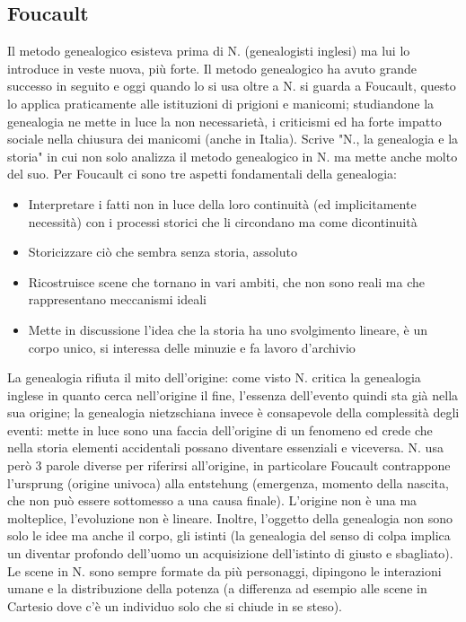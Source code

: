 \documentclass[10pt,a4paper]{article}
\begin{document}
\subsection{Foucault}
Il metodo genealogico esisteva prima di N. (genealogisti inglesi) ma lui lo introduce in veste nuova, più forte. Il metodo genealogico ha avuto grande successo in seguito e oggi quando lo si usa oltre a N. si guarda a Foucault, questo lo applica praticamente alle istituzioni di prigioni e manicomi; studiandone la genealogia ne mette in luce la non necessarietà, i criticismi ed ha forte impatto sociale nella chiusura dei manicomi (anche in Italia). Scrive "N., la genealogia e la storia" in cui non solo analizza il metodo genealogico in N. ma mette anche molto del suo. Per Foucault ci sono tre aspetti fondamentali della genealogia:
\begin{itemize}
	\item Interpretare i fatti non in luce della loro continuità (ed implicitamente necessità) con i processi storici che li circondano ma come dicontinuità
	\item Storicizzare ciò che sembra senza storia, assoluto
	\item Ricostruisce scene che tornano in vari ambiti, che non sono reali ma che rappresentano meccanismi ideali
	\item Mette in discussione l'idea che la storia ha uno svolgimento lineare, è un corpo unico, si interessa delle minuzie e fa lavoro d'archivio
\end{itemize} 
La genealogia rifiuta il mito dell'origine: come visto N. critica la genealogia inglese in quanto cerca nell'origine il fine, l'essenza dell'evento quindi sta già nella sua origine; la genealogia nietzschiana invece è consapevole della complessità degli eventi: mette in luce sono una faccia dell'origine di un fenomeno ed crede che nella storia elementi accidentali possano diventare essenziali e viceversa. N. usa però 3 parole diverse per riferirsi all'origine, in particolare Foucault contrappone l'ursprung (origine univoca) alla entstehung (emergenza, momento della nascita, che non può essere sottomesso a una causa finale). L'origine non è una ma molteplice, l'evoluzione non è lineare. Inoltre, l'oggetto della genealogia non sono solo le idee ma anche il corpo, gli istinti (la genealogia del senso di colpa implica un diventar profondo dell'uomo un acquisizione dell'istinto di giusto e sbagliato).\\
Le scene in N. sono sempre formate da più personaggi, dipingono le interazioni umane e la distribuzione della potenza (a differenza ad esempio alle scene in Cartesio dove c'è un individuo  solo che si chiude in se steso).\\
\end{document}

